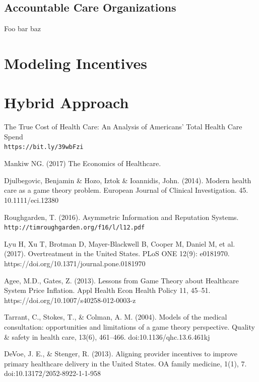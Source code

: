 \documentclass[a4paper]{llncs}
\begin{document}
\subsection*{Accountable Care Organizations}
Foo bar baz

\section*{Modeling Incentives}

\section*{Hybrid Approach}



\begin{thebibliography}{8}

The True Cost of Health Care: An Analysis of Americans’ Total Health Care Spend
\\\texttt{https://bit.ly/39wbFzi}

Mankiw NG. (2017) The Economics of Healthcare.

Djulbegovic, Benjamin \& Hozo, Iztok \& Ioannidis, John. (2014). Modern health care as a game theory problem. European Journal of Clinical Investigation. 45. 10.1111/eci.12380

Roughgarden, T. (2016). Asymmetric Information and Reputation Systems. \texttt{http://timroughgarden.org/f16/l/l12.pdf}

Lyu H, Xu T, Brotman D, Mayer-Blackwell B, Cooper M, Daniel M, et al. (2017). Overtreatment in the United States. PLoS ONE 12(9): e0181970. https://doi.org/10.1371/journal.pone.0181970

Agee, M.D., Gates, Z. (2013). Lessons from Game Theory about Healthcare System Price Inflation. Appl Health Econ Health Policy 11, 45–51. https://doi.org/10.1007/s40258-012-0003-z

Tarrant, C., Stokes, T., \& Colman, A. M. (2004). Models of the medical consultation: opportunities and limitations of a game theory perspective. Quality \& safety in health care, 13(6), 461–466. doi:10.1136/qhc.13.6.461kj

DeVoe, J. E., \& Stenger, R. (2013). Aligning provider incentives to improve primary healthcare delivery in the United States. OA family medicine, 1(1), 7. doi:10.13172/2052-8922-1-1-958


\end{thebibliography}
\end{document}

